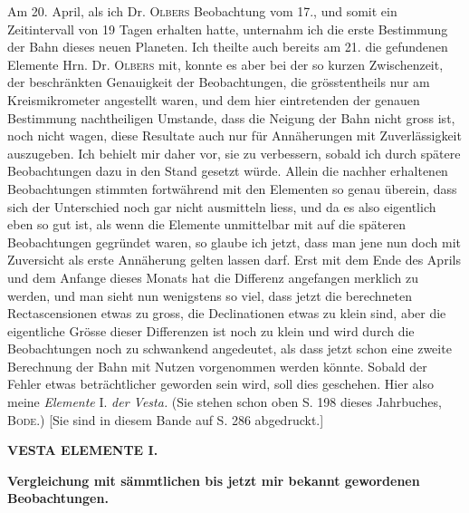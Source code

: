 \par\indent Am 20. April, als ich Dr. \textsc{Olbers} Beobachtung vom 17., und somit ein Zeitintervall von 19 Tagen
erhalten hatte, unternahm ich die erste Bestimmung der Bahn dieses neuen Planeten. Ich theilte
auch bereits am 21. die gefundenen Elemente Hrn. Dr. \textsc{Olbers} mit, konnte es aber bei der so kurzen
Zwischenzeit, der beschränkten Genauigkeit der Beobachtungen, die grösstentheils nur am Kreismikrometer angestellt waren, und dem hier eintretenden der genauen Bestimmung nachtheiligen
Umstande, dass die Neigung der Bahn nicht gross ist, noch nicht wagen, diese Resultate auch nur
für Annäherungen mit Zuverlässigkeit auszugeben. Ich behielt mir daher vor, sie zu verbessern,
sobald ich durch spätere Beobachtungen dazu in den Stand gesetzt würde. Allein die nachher
erhaltenen Beobachtungen stimmten fortwährend mit den Elementen so genau überein, dass sich der
Unterschied noch gar nicht ausmitteln liess, und da es also eigentlich eben so gut ist, als wenn die
Elemente unmittelbar mit auf die späteren Beobachtungen gegründet waren, so glaube ich jetzt, dass
man jene nun doch mit Zuversicht als erste Annäherung gelten lassen darf. Erst mit dem Ende des
Aprils und dem Anfange dieses Monats hat die Differenz angefangen merklich zu werden, und man
sieht nun wenigstens so viel, dass jetzt die berechneten Rectascensionen etwas zu gross, die Declinationen etwas zu klein sind, aber die eigentliche Grösse dieser Differenzen ist noch zu klein und
wird durch die Beobachtungen noch zu schwankend angedeutet, als dass jetzt schon eine zweite
Berechnung der Bahn mit Nutzen vorgenommen werden könnte. Sobald der Fehler etwas beträchtlicher geworden sein wird, soll dies geschehen. Hier also meine \emph{Elemente} I. \emph{der Vesta.} (Sie stehen
schon oben S. 198 dieses Jahrbuches, \textsc{Bode}.) [Sie sind in diesem Bande auf S. 286 abgedruckt.]
\par
\clearpage
\thispagestyle{empty}
\noindent{}%
%
\parbox[t]{\dimexpr\linewidth-24mm\relax}{\centering\footnotesize\bfseries VESTA ELEMENTE I.\par}%
\makebox[12mm][r]{}\par\nobreak\medskip
\begin{center}\small\textbf{Vergleichung mit sämmtlichen bis jetzt mir bekannt gewordenen Beobachtungen.}\end{center}

